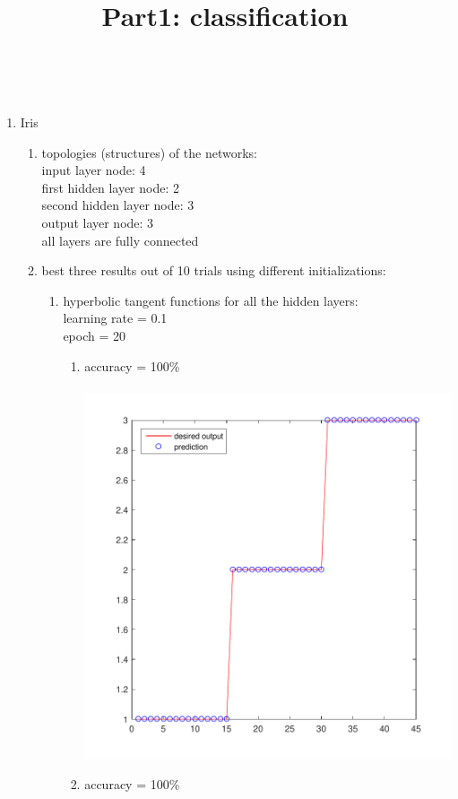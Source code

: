 \documentclass[12pt,a4paper]{article}
\begin{document}
\begin{CJK}{UTF8}{bsmi}
\title{\large \bf  Part1: classification}
\\
\begin{enumerate}
	\item Iris 
	\begin{enumerate}
	\item topologies (structures) of the networks: \\
	input layer node: 4 \\
	first hidden layer node: 2 \\
	second hidden layer node: 3 \\
	output layer node: 3\\
	all layers are fully connected
	\item best three results out of 10 trials using different initializations:
	\begin{enumerate}
		\item hyperbolic tangent functions for all the hidden layers:
		\\
		learning rate = 0.1 \\
		epoch = 20
		\begin{enumerate}
\item accuracy = 100\%\\\
\includegraphics[scale=0.6]{irishh1}
\newpage	
\item accuracy = 100\%\\\

\end{enumerate}
\end{enumerate}
\end{enumerate}
\end{enumerate}
\end{CJK}
\end{document}
